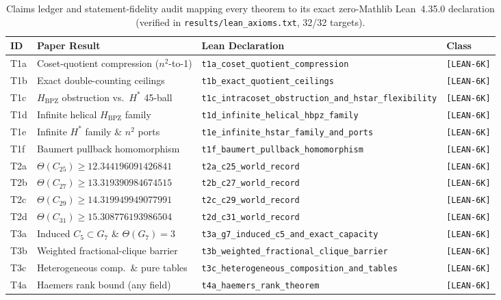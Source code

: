 \documentclass[11pt,reqno]{amsart}
\theoremstyle{definition}
\newcommand{\Hbpz}{H_{\mathrm{BPZ}}}
\newcommand{\Hstar}{H^*}
\newcommand{\lean}[1]{\nolinkurl{#1}}
\begin{document}
\begin{table}[t]
\centering
\caption{Claims ledger and statement-fidelity audit mapping every theorem to its exact zero-Mathlib Lean~4.35.0 declaration (verified in \texttt{results/lean\_axioms.txt}, 32/32 targets).}\label{tab:fidelity}
\footnotesize
\setlength{\tabcolsep}{2.5pt}
\begin{tabular}{@{}llll@{}}
\toprule
ID & Paper Result & Lean Declaration & Class \\
\midrule
T1a & Coset-quotient compression ($n^2$-to-1) & \lean{t1a_coset_quotient_compression} & \texttt{[LEAN-6K]} \\
T1b & Exact double-counting ceilings & \lean{t1b_exact_quotient_ceilings} & \texttt{[LEAN-6K]} \\
T1c & $\Hbpz$ obstruction vs.\ $\Hstar$ 45-ball & \lean{t1c_intracoset_obstruction_and_hstar_flexibility} & \texttt{[LEAN-6K]} \\
T1d & Infinite helical $\Hbpz$ family & \lean{t1d_infinite_helical_hbpz_family} & \texttt{[LEAN-6K]} \\
T1e & Infinite $\Hstar$ family \& $n^2$ ports & \lean{t1e_infinite_hstar_family_and_ports} & \texttt{[LEAN-6K]} \\
T1f & Baumert pullback homomorphism & \lean{t1f_baumert_pullback_homomorphism} & \texttt{[LEAN-6K]} \\
\addlinespace[2pt]
T2a & $\Theta(C_{25})\ge 12.344196091426841$ & \lean{t2a_c25_world_record} & \texttt{[LEAN-6K]} \\
T2b & $\Theta(C_{27})\ge 13.319390984674515$ & \lean{t2b_c27_world_record} & \texttt{[LEAN-6K]} \\
T2c & $\Theta(C_{29})\ge 14.319949949077991$ & \lean{t2c_c29_world_record} & \texttt{[LEAN-6K]} \\
T2d & $\Theta(C_{31})\ge 15.308776193986504$ & \lean{t2d_c31_world_record} & \texttt{[LEAN-6K]} \\
\addlinespace[2pt]
T3a & Induced $C_5\subset G_7$ \& $\Theta(G_7)=3$ & \lean{t3a_g7_induced_c5_and_exact_capacity} & \texttt{[LEAN-6K]} \\
T3b & Weighted fractional-clique barrier & \lean{t3b_weighted_fractional_clique_barrier} & \texttt{[LEAN-6K]} \\
T3c & Heterogeneous comp.\ \& pure tables & \lean{t3c_heterogeneous_composition_and_tables} & \texttt{[LEAN-6K]} \\
\addlinespace[2pt]
T4a & Haemers rank bound (any field) & \lean{t4a_haemers_rank_theorem} & \texttt{[LEAN-6K]} \\

\end{tabular}
\end{table}
\end{document}
